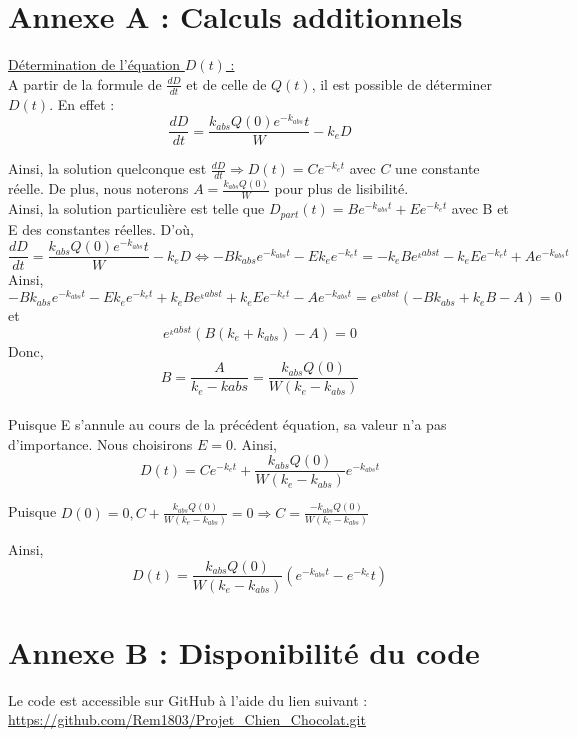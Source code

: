 \documentclass[11pt,a4paper]{article}
\begin{document}
\appendix

\section{Annexe A : Calculs additionnels}

\underline{Détermination de l'équation $D(t)$ :}
\\
A partir de la formule de $\frac{dD}{dt}$ et de celle de $Q(t)$, il est possible de déterminer
$D(t)$. En effet : \\
\[
\frac{dD}{dt}=\frac{k_{abs}Q(0)e^{-k_{abs}}t}{W}-k_eD
\]

Ainsi, la solution quelconque est $\frac{dD}{dt} \Rightarrow D(t)=Ce^{-k_et}$ avec $C$ une constante réelle. 
De plus, nous noterons $A=\frac{k_{abs}Q(0)}{W}$ pour plus de lisibilité.
\\
Ainsi, la solution particulière est telle que $D_{part}(t)=Be^{-k_{abs}t}+Ee^{-k_et}$ avec B et E des constantes réelles. 
D'où, 
\[
\frac{dD}{dt}=\frac{k_{abs}Q(0)e^{-k_{abs}}t}{W}-k_eD \Leftrightarrow -Bk_{abs}e^{-k_{abs}t}-Ek_ee^{-k_et}=-k_eBe^{_k{abs}t}-k_eEe^{-k_et}+Ae^{-k_{abs}t}
\]
Ainsi, 
\[
-Bk_{abs}e^{-k_{abs}t}-Ek_ee^{-k_et}+k_eBe^{_k{abs}t}+k_eEe^{-k_et}-Ae^{-k_{abs}t}=e^{_k{abs}t}(-Bk_{abs}+k_eB-A)=0
\]
et
\[
e^{_k{abs}t}(B(k_e + k_{abs})-A)=0
\]
Donc, 
\[
B=\frac{A}{k_e-k{abs}}=\frac{k_{abs}Q(0)}{W(k_e-k_{abs})}
\]
\\
Puisque E s'annule au cours de la précédent équation, sa valeur n'a pas d'importance. Nous 
choisirons $E=0$. 
Ainsi, 
\[
D(t)=Ce^{-k_et}+\frac{k_{abs}Q(0)}{W(k_e-k_{abs})}e^{-k_{abs}t}
\]

Puisque $D(0)=0, C+\frac{k_{abs}Q(0)}{W(k_e-k_{abs})}=0 \Rightarrow C=\frac{-k_{abs}Q(0)}{W(k_e-k_{abs})}$

Ainsi, 
\[
D(t)=\frac{k_{abs}Q(0)}{W(k_e-k_{abs})}(e^{-k_{abs}t}-e^{-k_e}t)
\]

\section{Annexe B : Disponibilité du code}

Le code est accessible sur GitHub à l'aide du lien suivant : \url{https://github.com/Rem1803/Projet_Chien_Chocolat.git}
\end{document}
